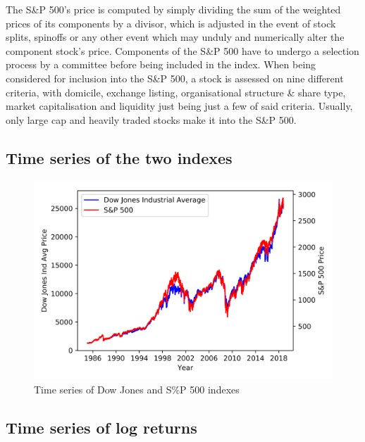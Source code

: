 \documentclass[a4paper]{article}
\begin{document}
The S\&P 500’s price is computed by simply dividing the sum of the weighted prices of its components by a divisor, which is adjusted in the event of stock splits, spinoffs or any other event which may unduly and numerically alter the component stock’s price. Components of the S\&P 500 have to undergo a selection process by a committee before being included in the index.  When being considered for inclusion into the S\&P 500, a stock is assessed on nine different criteria, with domicile, exchange listing, organisational structure \& share type, market capitalisation and liquidity just being just a few of said criteria. Usually, only large cap and heavily traded stocks make it into the S\&P 500.

\subsection{Time series of the two indexes}

\begin{figure}[h]
	\includegraphics[width=\linewidth]{time_series.png}
	\caption{Time series of Dow Jones and S\%P 500 indexes}
\end{figure}

\subsection{Time series of log returns}
\end{document}
